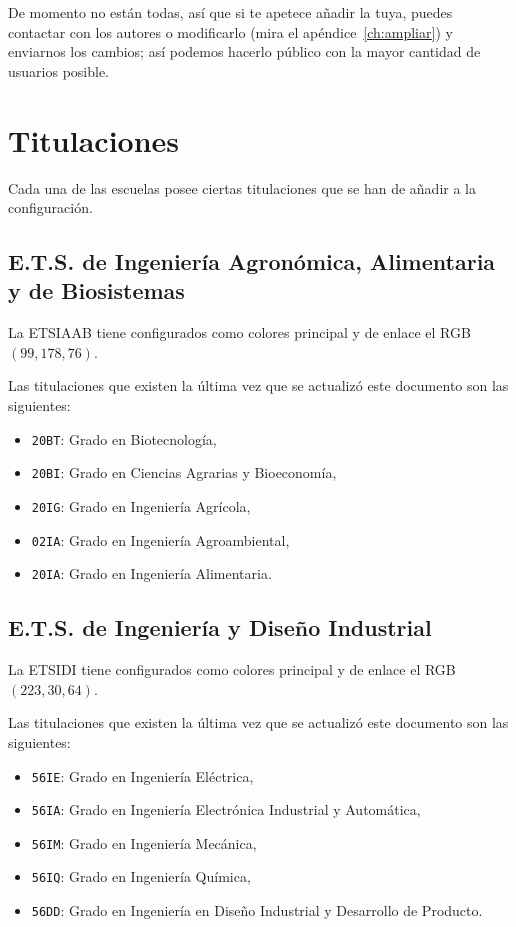De momento no están todas, así que si te apetece añadir la tuya, puedes contactar con los autores o modificarlo (mira el apéndice~\ref{ch:ampliar}) y enviarnos los cambios; así podemos hacerlo público con la mayor cantidad de usuarios posible.

\section{Titulaciones}

Cada una de las escuelas posee ciertas titulaciones que se han de añadir a la configuración.

\subsection{E.T.S. de Ingeniería Agronómica, Alimentaria y de Biosistemas}

La ETSIAAB tiene configurados como colores principal y de enlace el RGB $(99,178,76)$.

Las titulaciones que existen la última vez que se actualizó este documento son las siguientes:

\begin{itemize}
    \item \texttt{20BT}: Grado en Biotecnología,
    \item \texttt{20BI}: Grado en Ciencias Agrarias y Bioeconomía,
    \item \texttt{20IG}: Grado en Ingeniería Agrícola,
    \item \texttt{02IA}: Grado en Ingeniería Agroambiental,
    \item \texttt{20IA}: Grado en Ingeniería Alimentaria.
\end{itemize}

\subsection{E.T.S. de Ingeniería y Diseño Industrial}

La ETSIDI tiene configurados como colores principal y de enlace el RGB $(223,30,64)$.

Las titulaciones que existen la última vez que se actualizó este documento son las siguientes:

\begin{itemize}
    \item \texttt{56IE}: Grado en Ingeniería Eléctrica,
    \item \texttt{56IA}: Grado en Ingeniería Electrónica Industrial y Automática,
    \item \texttt{56IM}: Grado en Ingeniería Mecánica,
    \item \texttt{56IQ}: Grado en Ingeniería Química,
    \item \texttt{56DD}: Grado en Ingeniería en Diseño Industrial y Desarrollo de Producto.
\end{itemize}

